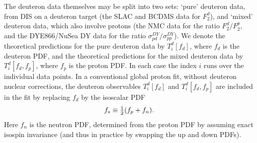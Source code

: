 \documentclass[11pt,a4paper]{article}
\newcommand{\smallfrac}[2]{{\mathchoice{\textstyle{\frac{#1}{#2}}}%
  {\scriptstyle{\frac{#1}{#2}}}{\scriptscriptstyle{\frac{#1}{#2}}}{#1/#2}}}
\begin{document}
The deuteron data themselves may be split into two sets: `pure' deuteron data,
from DIS on a deuteron target (the SLAC and BCDMS data for $F_2^d$), and
`mixed' deuteron data, which also involve protons (the NMC data for the ratio
$F_2^d/F_2^p$, and the DYE866/NuSea DY data for the ratio
$\sigma^{DY}_{pd}/\sigma^{DY}_{pp}$). We denote the theoretical predictions for the
pure deuteron data by $T_i^d[f_d]$, where $f_d$ is the deuteron PDF, and the
theoretical predictions for the mixed deuteron data by $T_i^d[f_d,f_p]$, where
$f_p$ is the proton PDF. In each case the index $i$ runs over the individual
data points. In a conventional global proton fit, without deuteron nuclear
corrections, the deuteron observables $T_i^d[f_d]$ and $T_i^d[f_d,f_p]$ are
included in the fit by replacing $f_d$ by the isoscalar PDF
\begin{equation}
  f_s \equiv \smallfrac{1}{2}(f_p+f_n).
  \label{eq:isoscalar}
\end{equation}
Here $f_n$ is the neutron PDF, determined from the proton PDF by assuming exact
isospin invariance (and thus in practice by swapping the up and down PDFs).
\end{document}
